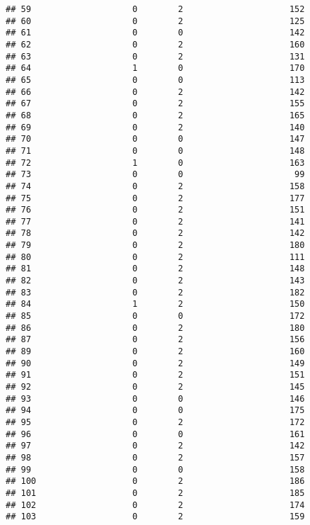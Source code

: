 \documentclass[]{article}
\begin{document}
\begin{verbatim}
## 59                    0        2                     152
## 60                    0        2                     125
## 61                    0        0                     142
## 62                    0        2                     160
## 63                    0        2                     131
## 64                    1        0                     170
## 65                    0        0                     113
## 66                    0        2                     142
## 67                    0        2                     155
## 68                    0        2                     165
## 69                    0        2                     140
## 70                    0        0                     147
## 71                    0        0                     148
## 72                    1        0                     163
## 73                    0        0                      99
## 74                    0        2                     158
## 75                    0        2                     177
## 76                    0        2                     151
## 77                    0        2                     141
## 78                    0        2                     142
## 79                    0        2                     180
## 80                    0        2                     111
## 81                    0        2                     148
## 82                    0        2                     143
## 83                    0        2                     182
## 84                    1        2                     150
## 85                    0        0                     172
## 86                    0        2                     180
## 87                    0        2                     156
## 89                    0        2                     160
## 90                    0        2                     149
## 91                    0        2                     151
## 92                    0        2                     145
## 93                    0        0                     146
## 94                    0        0                     175
## 95                    0        2                     172
## 96                    0        0                     161
## 97                    0        2                     142
## 98                    0        2                     157
## 99                    0        0                     158
## 100                   0        2                     186
## 101                   0        2                     185
## 102                   0        2                     174
## 103                   0        2                     159

\end{verbatim}
\end{document}
